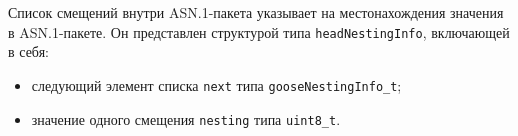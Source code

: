 Список смещений внутри ASN.1-пакета указывает на местонахождения значения в ASN.1-пакете. Он представлен структурой типа \lstinline{headNestingInfo}, включающей в себя:

\begin{itemize}
    \item следующий элемент списка \lstinline{next} типа \lstinline{gooseNestingInfo_t};
    \item значение одного смещения \lstinline{nesting} типа \lstinline{uint8_t}.
\end{itemize}

